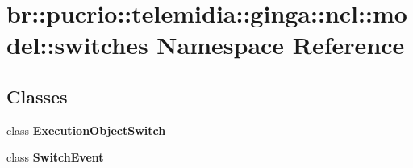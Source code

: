 \section{br::pucrio::telemidia::ginga::ncl::model::switches Namespace Reference}
\label{namespacebr_1_1pucrio_1_1telemidia_1_1ginga_1_1ncl_1_1model_1_1switches}


\subsection*{Classes}
\begin{CompactItemize}
\item 
class {\bf ExecutionObjectSwitch}
\item 
class {\bf SwitchEvent}
\end{CompactItemize}
